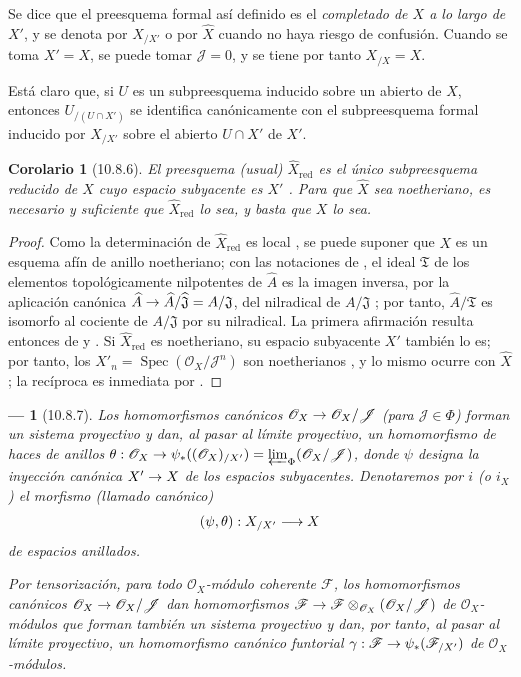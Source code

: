 \documentclass[oneside]{amsart}
\theoremstyle{ega-env-style}
\newtheorem*{env}{---}
\theoremstyle{ega-thm-env-style}
\newtheorem*{corollary}{Corolario}
\theoremstyle{ega-defn-env-style}
\renewcommand{\to}{\mathchoice{\longrightarrow}{\rightarrow}{\rightarrow}{\rightarrow}}
\newcommand{\oldpage}[2][]{{\marginnote{\normalfont{\textbf{#1}~|~#2}}}\ignorespaces}
\let\EGAOriginalLabel\label
\renewcommand{\label}[1]{\phantomsection\EGAOriginalLabel{#1}}
\begin{document}
Se dice que el preesquema formal así definido es el \emph{completado de $X$ a lo largo de $X'$}, y se denota por $X_{/X'}$ o por $\widehat X$ cuando no haya riesgo de confusión.
Cuando se toma $X'=X$, se puede tomar $\mathscr{J}=0$, y se tiene por tanto $X_{/X}=X$.

Está claro que, si $U$ es un subpreesquema inducido sobre un abierto de $X$, entonces $U_{/(U\cap X')}$ se identifica canónicamente con el subpreesquema formal inducido por $X_{/X'}$ sobre el abierto $U\cap X'$ de $X'$.

\begin{corollary}[10.8.6]
\label{I.10.8.6}
El preesquema (usual) $\widehat X_{\mathrm{red}}$ es el único subpreesquema reducido de $X$ cuyo espacio subyacente es $X'$ .
Para que $\widehat X$ sea noetheriano, es necesario y suficiente que $\widehat X_{\mathrm{red}}$ lo sea, y basta que $X$ lo sea.
\end{corollary}

\oldpage[I]{196}

\begin{proof}
Como la determinación de $\widehat X_{\mathrm{red}}$ es local , se puede suponer que $X$ es un esquema afín de anillo noetheriano; con las notaciones de , el ideal $\mathfrak{T}$ de los elementos topológicamente nilpotentes de $\widehat A$ es la imagen inversa, por la aplicación canónica $\widehat A\to\widehat A/\widehat{\mathfrak{J}}=A/\mathfrak{J}$, del nilradical de $A/\mathfrak{J}$ ; por tanto, $\widehat A/\mathfrak{T}$ es isomorfo al cociente de $A/\mathfrak{J}$ por su nilradical.
La primera afirmación resulta entonces de  y .
Si $\widehat X_{\mathrm{red}}$ es noetheriano, su espacio subyacente $X'$ también lo es; por tanto, los $X'_n=\operatorname{Spec}(\mathscr{O}_X/\mathscr{J}^n)$ son noetherianos , y lo mismo ocurre con $\widehat X$ ; la recíproca es inmediata por .
\end{proof}

\begin{env}[10.8.7]
\label{I.10.8.7}
Los homomorfismos canónicos $\mathscr{O}_X\to\mathscr{O}_X/\mathscr{J}$ (para $\mathscr{J}\in\Phi$) forman un sistema proyectivo y dan, al pasar al límite proyectivo, un homomorfismo de haces de anillos $\theta:\mathscr{O}_X\to\psi_*((\mathscr{O}_X)_{/X'})
=\varprojlim_\Phi(\mathscr{O}_X/\mathscr{J})$, donde $\psi$ designa la inyección canónica $X'\to X$ de los espacios subyacentes.
Denotaremos por $i$ (o $i_X$) el morfismo (llamado \emph{canónico})
\[
  (\psi,\theta):X_{/X'}\to X
\]
de espacios anillados.

Por tensorización, para todo $\mathscr{O}_X$-módulo coherente $\mathscr{F}$, los homomorfismos canónicos $\mathscr{O}_X\to\mathscr{O}_X/\mathscr{J}$ dan homomorfismos $\mathscr{F}\to
\mathscr{F}\otimes_{\mathscr{O}_X}(\mathscr{O}_X/\mathscr{J})$ de $\mathscr{O}_X$-módulos que forman también un sistema proyectivo y dan, por tanto, al pasar al límite proyectivo, un homomorfismo canónico funtorial $\gamma:\mathscr{F}\to\psi_*(\mathscr{F}_{/X'})$ de $\mathscr{O}_X$-módulos.
\end{env}
\end{document}
